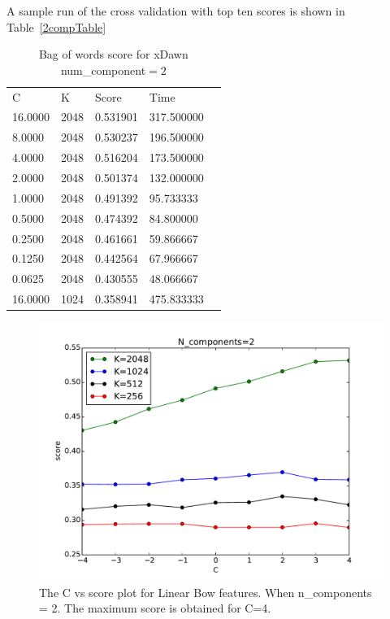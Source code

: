 \documentclass[final,leqno,onefignum,onetabnum]{siamltexmm}
\begin{document}
A sample run of the cross validation with top ten scores is shown in Table~\ref{2compTable}
\begin{table}[]\label{2compTable}
\centering
\caption{Bag of words score for xDawn num\_component$=2$}
\label{2comp}
\begin{tabular}{lllll}
  C      &    K &    Score &       Time \\  
16.0000 & 2048 & 0.531901 & 317.500000  \\
8.0000  & 2048 & 0.530237 & 196.500000  \\                                                                            
4.0000  & 2048 & 0.516204 & 173.500000  \\                                                                            
2.0000  & 2048 & 0.501374 & 132.000000  \\  
1.0000  & 2048 & 0.491392 &  95.733333  \\                                                                            
0.5000  & 2048 & 0.474392 &  84.800000  \\                                                                            
0.2500  & 2048 & 0.461661 &  59.866667  \\                                                                            
0.1250  & 2048 & 0.442564 &  67.966667  \\                                                                            
0.0625  & 2048 & 0.430555 &  48.066667  \\                                                                            
16.0000 & 1024 & 0.358941 & 475.833333  \\                                                                            
\end{tabular}
\end{table}

\begin{figure}
  \centering
  \includegraphics[width=0.60\linewidth]{images/score2Components}
  \caption{The C vs score plot for Linear Bow features. When n\_components = 2.  The maximum score is obtained for C=4.\label{fig:bowf_score2}}
\end{figure}
\end{document}
